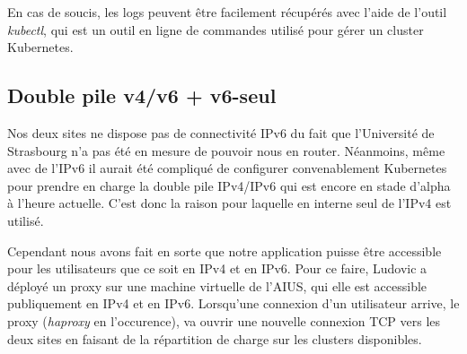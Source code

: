 En cas de soucis, les logs peuvent être facilement récupérés avec l'aide
de l'outil \textit{kubectl}, qui est un outil en ligne de commandes
utilisé pour gérer un cluster Kubernetes.

\subsection{Double pile v4/v6 + v6-seul}

Nos deux sites ne dispose pas de connectivité IPv6 du fait que
l'Université de Strasbourg n'a pas été en mesure de pouvoir nous en
router. Néanmoins, même avec de l'IPv6 il aurait été compliqué de
configurer convenablement Kubernetes pour prendre en charge la double
pile IPv4/IPv6 qui est encore en stade d'alpha à l'heure actuelle. C'est
donc la raison pour laquelle en interne seul de l'IPv4 est utilisé.

Cependant nous avons fait en sorte que notre application puisse être
accessible pour les utilisateurs que ce soit en IPv4 et en IPv6. Pour ce
faire, Ludovic a déployé un proxy sur une machine virtuelle de l'AIUS,
qui elle est accessible publiquement en IPv4 et en IPv6. Lorsqu'une
connexion d'un utilisateur arrive, le proxy (\textit{haproxy} en
l'occurence), va ouvrir une nouvelle connexion TCP vers les deux sites
en faisant de la répartition de charge sur les clusters disponibles.
